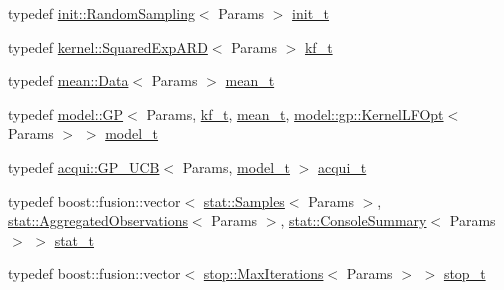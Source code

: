 \begin{DoxyCompactItemize}
\item 
typedef \hyperlink{structlimbo_1_1init_1_1_random_sampling}{init\+::\+Random\+Sampling}$<$ Params $>$ \hyperlink{structlimbo_1_1bayes__opt_1_1_bo_base_1_1defaults_acbba74470eccef31c3f2518a3c57200c}{init\+\_\+t}
\item 
typedef \hyperlink{structlimbo_1_1kernel_1_1_squared_exp_a_r_d}{kernel\+::\+Squared\+Exp\+A\+R\+D}$<$ Params $>$ \hyperlink{structlimbo_1_1bayes__opt_1_1_bo_base_1_1defaults_aec54234d95d97261acf5aacca83eecaa}{kf\+\_\+t}
\item 
typedef \hyperlink{structlimbo_1_1mean_1_1_data}{mean\+::\+Data}$<$ Params $>$ \hyperlink{structlimbo_1_1bayes__opt_1_1_bo_base_1_1defaults_aa8dcb3af9a3dffffb4749104cd27a597}{mean\+\_\+t}
\item 
typedef \hyperlink{classlimbo_1_1model_1_1_g_p}{model\+::\+G\+P}$<$ Params, \hyperlink{structlimbo_1_1bayes__opt_1_1_bo_base_1_1defaults_aec54234d95d97261acf5aacca83eecaa}{kf\+\_\+t}, \hyperlink{structlimbo_1_1bayes__opt_1_1_bo_base_1_1defaults_aa8dcb3af9a3dffffb4749104cd27a597}{mean\+\_\+t}, \hyperlink{structlimbo_1_1model_1_1gp_1_1_kernel_l_f_opt}{model\+::gp\+::\+Kernel\+L\+F\+Opt}$<$ Params $>$ $>$ \hyperlink{structlimbo_1_1bayes__opt_1_1_bo_base_1_1defaults_a6f8da6a743f6a87096f8e0b9d4411503}{model\+\_\+t}
\item 
typedef \hyperlink{classlimbo_1_1acqui_1_1_g_p___u_c_b}{acqui\+::\+G\+P\+\_\+\+U\+C\+B}$<$ Params, \hyperlink{structlimbo_1_1bayes__opt_1_1_bo_base_1_1defaults_a6f8da6a743f6a87096f8e0b9d4411503}{model\+\_\+t} $>$ \hyperlink{structlimbo_1_1bayes__opt_1_1_bo_base_1_1defaults_a4ba658f2746db27c5f3abdb24d2a2f85}{acqui\+\_\+t}
\item 
typedef boost\+::fusion\+::vector$<$ \hyperlink{structlimbo_1_1stat_1_1_samples}{stat\+::\+Samples}$<$ Params $>$, \hyperlink{structlimbo_1_1stat_1_1_aggregated_observations}{stat\+::\+Aggregated\+Observations}$<$ Params $>$, \hyperlink{structlimbo_1_1stat_1_1_console_summary}{stat\+::\+Console\+Summary}$<$ Params $>$ $>$ \hyperlink{structlimbo_1_1bayes__opt_1_1_bo_base_1_1defaults_a70f64f21a85e2fa25063709abd5a2467}{stat\+\_\+t}
\item 
typedef boost\+::fusion\+::vector$<$ \hyperlink{structlimbo_1_1stop_1_1_max_iterations}{stop\+::\+Max\+Iterations}$<$ Params $>$ $>$ \hyperlink{structlimbo_1_1bayes__opt_1_1_bo_base_1_1defaults_a3cb5d1c8866494a7a641e6f3b4367d75}{stop\+\_\+t}
\end{DoxyCompactItemize}


